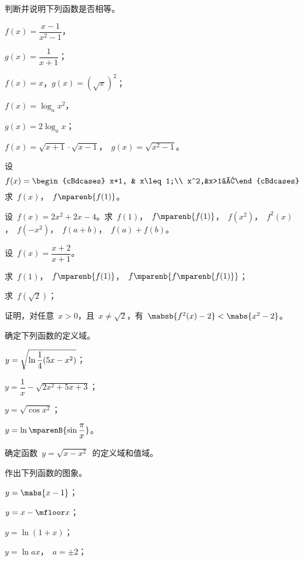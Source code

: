 \begin{exercise}
\item 判断并说明下列函数是否相等。
\begin{exlistcols}[4]
  \item $f(x)=\dfrac{x-1}{x^2-1}$，
  \item[]$g(x)=\dfrac1{x+1}$；
  \item $f(x)=x$，\quad $g(x)=(\sqrt x)^2$；
  \item $f(x)=\log_ax^2$，
  \item[]$g(x)=2\log_ax$；
  \item $f(x)=\sqrt{x+1}\cdot\sqrt{x-1}$，~$g(x)=\sqrt{x^2-1}$。
\end{exlistcols}
\item 设
\[
  f(x)=\begin{cBdcases}
  x+1, & x\leq 1;\\
  x^2,&x>1。\end{cBdcases}
\]
求~$f(x)$，~$f\mparenb{f(1)}$。
\item 设~$f(x)=2x^2+2x-4$。求~$f(1)$，~$f\mparenb{f(1)}$，~$f(x^2)$，~$f^2(x)$，~$f(-x^2)$，~$f(a+b)$，~$f(a)+f(b)$。
\item 设~$f(x)=\dfrac{x+2}{x+1}$。
\begin{exlistcols}
  \item 求~$f(1)$，~$f\mparenb{f(1)}$，~$f\mparenb{f\mparenb{f(1)}}$；
  \item 求~$f(\sqrt2)$；
  \item 证明，对任意~$x>0$，且~$x\neq\sqrt2$，有~$\mabsb{f^2(x)-2}<\mabs{x^2-2}$。
\end{exlistcols}
\item 确定下列函数的定义域。
\begin{exlistcols}
  \item $y=\sqrt{\ln\dfrac1{\smash[b]{4}}(5x-x^2)}$；
  \item $y=\dfrac1x-\sqrt{2x^2+5x+3}$；
  \item $y=\sqrt{\cos x^2}$；
  \item $y=\ln\mparenB{\sin\dfrac\pi x}$。
\end{exlistcols}
\item 确定函数~$y=\sqrt{x-x^2}$~的定义域和值域。
\item 作出下列函数的图象。
\begin{exlistcols}[3]
  \item $y=\mabs{x-1}$；
  \item $y=x-\mfloor x$；
  \item $y=\ln(1+x)$；
  \item $y=\ln ax$，~$a=\pm2$；

\end{exlistcols}
\end{exercise}
